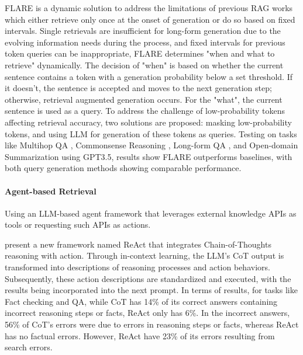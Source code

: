 FLARE \citep{jiang2023active} is a dynamic solution to address the limitations of previous RAG works which either retrieve only once at the onset of generation or do so based on fixed intervals. Single retrievals are insufficient for long-form generation due to the evolving information needs during the process, and fixed intervals for previous token queries can be inappropriate, FLARE determines "when and what to retrieve" dynamically. The decision of "when" is based on whether the current sentence contains a token with a generation probability below a set threshold. If it doesn't, the sentence is accepted and moves to the next generation step; otherwise, retrieval augmented generation occurs. For the "what", the current sentence is used as a query. To address the challenge of low-probability tokens affecting retrieval accuracy, two solutions are proposed: masking low-probability tokens, and using LLM for generation of these tokens as queries. Testing on tasks like Multihop QA \citep{2WikiMultihopQA}, Commonsense Reasoning \citep{StrategyQA}, Long-form QA \citep{ASQA}, and Open-domain Summarization \citep{wikiasp} using GPT3.5, results show FLARE outperforms baselines, with both query generation methods showing comparable performance.

\paragraph{\textbf{Agent-based Retrieval}} 
Using an LLM-based agent framework that leverages external knowledge APIs as tools or requesting such APIs as actions.

\citet{yao2023react} present a new framework named ReAct that integrates Chain-of-Thoughts reasoning with action. Through in-context learning, the LLM's CoT output is transformed into descriptions of reasoning processes and action behaviors. Subsequently, these action descriptions are standardized and executed, with the results being incorporated into the next prompt. In terms of results, for tasks like Fact checking and QA, while CoT has 14\% of its correct answers containing incorrect reasoning steps or facts, ReAct only has 6\%. In the incorrect answers, 56\% of CoT's errors were due to errors in reasoning steps or facts, whereas ReAct has no factual errors. However, ReAct have 23\% of its errors resulting from search errors.

